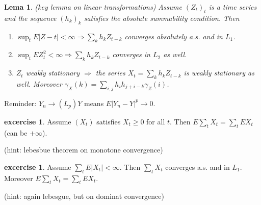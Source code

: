 \documentclass[12pt,a4paper]{amsart}
\theoremstyle{definition} %
\newtheorem{excercise}[defn]{excercise}
\theoremstyle{plain} %
\newtheorem{lema}[defn]{Lema}
\begin{document}
\begin{lema} (key lemma on linear transformations)
Assume $(Z_t)_t$ is a time series and the sequence $(h_k)_k$ satisfies the absolute summability condition. Then 
\begin{enumerate}
\item $\sup_t{E|Z-t|} < \infty \Rightarrow  \sum_k h_k Z_{t-k}$ converges absolutely a.s. and in $L_1$. 
\item $\sup_t{E Z_t^2} < \infty \Rightarrow \sum_k h_k Z_{t-k}$ converges in $L_2$ as well.
\item $Z_t$ weakly stationary $\Rightarrow$ the series $X_t = \sum_k h_k Z_{t-k}$ is weakly stationary as well. Moreover $\gamma_X(k) = \sum_{i,j} h_i h_{j + i - k} \gamma_Z(i)$.
\end{enumerate}

\end{lema}


Reminder:
$Y_n \rightarrow (L_p) Y$ means $E|Y_n - Y|^p \rightarrow 0$. 


\begin{excercise}
Assume $(X_t)$ satisfies $X_t \geq 0$ for all $t$. Then $E\sum_t X_t = \sum_t E X_t$ (can be $+ \infty$).

(hint: lebesbue theorem on monotone convergence)
\end{excercise}

\begin{excercise}
Assume $\sum_t E|X_t| < \infty$. Then $\sum_t X_t$ converges a.s. and in $L_1$. Moreover $E\sum_t X_t = \sum_t E X_t$.

(hint: again lebesgue, but on dominat convergence)
\end{excercise}
\end{document}

